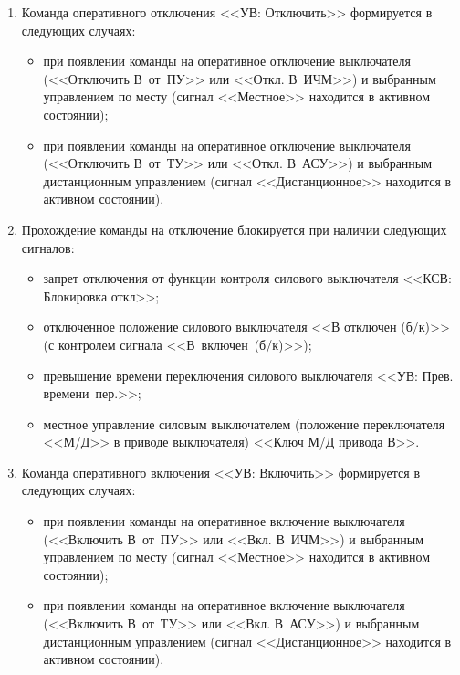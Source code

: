 \begin{enumerate}
\begin{enumerate}
\item
Команда оперативного отключения <<УВ: Отключить>> формируется в следующих случаях:
\begin{itemize}
	\item при появлении команды на оперативное отключение выключателя (<<Отключить В~от~ПУ>> или <<Откл. В~ИЧМ>>) и выбранным управлением по месту (сигнал <<Местное>> находится в активном состоянии);
	\item при появлении команды на оперативное отключение выключателя (<<Отключить В~от~ТУ>> или <<Откл. В~АСУ>>) и выбранным дистанционным управлением (сигнал <<Дистанционное>> находится в активном состоянии).
\end{itemize}
\item
Прохождение команды на отключение блокируется при наличии следующих сигналов:
\begin{itemize}
	\item запрет отключения от функции контроля силового выключателя <<КСВ: Блокировка откл>>;
	\item отключенное положение силового выключателя <<В отключен (б/к)>> (с контролем сигнала <<В~включен~(б/к)>>);
	\item превышение времени переключения силового выключателя <<УВ: Прев. времени~пер.>>;
	\item местное управление силовым выключателем (положение переключателя <<М/Д>> в приводе выключателя) <<Ключ М/Д привода В>>.
\end{itemize}

\item
Команда оперативного включения <<УВ: Включить>> формируется в следующих случаях:
\begin{itemize}
	\item при появлении команды на оперативное включение выключателя (<<Включить В~от~ПУ>> или <<Вкл. В~ИЧМ>>) и выбранным управлением по месту (сигнал <<Местное>> находится в активном состоянии);
	\item при появлении команды на оперативное включение выключателя (<<Включить В~от~ТУ>> или <<Вкл. В~АСУ>>) и выбранным дистанционным управлением (сигнал <<Дистанционное>> находится в активном состоянии).


\end{itemize}
\end{enumerate}
\end{enumerate}
